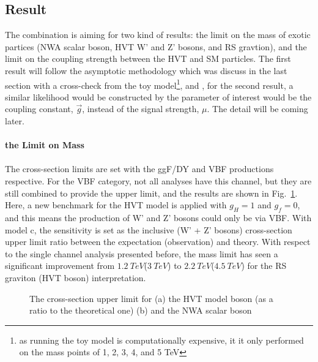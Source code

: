 \subsection{Result}
The combination is aiming for two kind of results: the limit on the mass of exotic partices (NWA scalar boson, HVT W' and Z' bosons, and RS gravtion), and the limit on the coupling strength between the HVT and SM particles. The first result will follow the asymptotic methodology which was discuss in the last section with a cross-check from the toy model\footnote{as running the toy model is computationally expensive, it it only performed on the mass points of 1, 2, 3, 4, and 5 TeV}, and , for the second result, a similar likelihood would be constructed by the parameter of interest would be the coupling constant, $\vec{g}$, instead of the signal strength, $\mu$. The detail will be coming later. 
\\
\\{\bf the Limit on Mass}
\\
\\The cross-section limits are set with the ggF/DY and VBF productions respective. For the VBF category, not all analyses have this channel, but they are still combined to provide the upper limit, and the results are shown in Fig.~\ref{Fig:limit_VBF_comb}. Here, a new benchmark for the HVT model is applied with $g_{H}=1$ and $g_{f}=0$, and this means the production of W' and Z' bosons could only be via VBF. With model c, the sensitivity is set as the inclusive (W' + Z' bosons) cross-section upper limit ratio between the expectation (observation) and theory. With respect to the single channel analysis presented before, the mass limit has seen a significant improvement from $1.2~TeV$($3~TeV$) to $2.2~TeV$($4.5~TeV$) for the RS graviton (HVT boson) interpretation.   
\begin{figure}[ht]
	\centering
	\caption{The cross-section upper limit for (a) the HVT model boson (as a ratio to the theoretical one) (b) and the NWA scalar boson }
	\label{Fig:limit_VBF_comb}
\end{figure}
